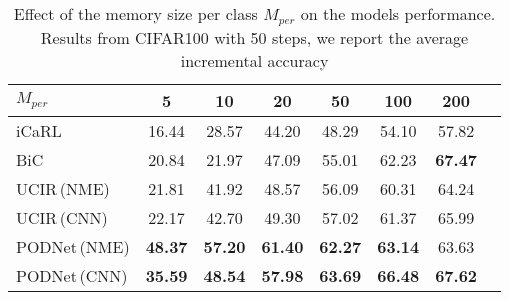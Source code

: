 \begin{table}[t]
    \centering
    \begin{tabular}{@{}lccccccc@{}}
        \toprule
        $M_{per}$                                          & 5              & 10             & \textbf{20}    & 50             & 100            & 200            \\
        \midrule
        iCaRL \citep{rebuffi2017icarl}                     & 16.44          & 28.57          & 44.20          & 48.29          & 54.10          & 57.82          \\
        BiC \citep{wu2019bias_correction}                  & 20.84          & 21.97          & 47.09          & 55.01          & 62.23          & \textbf{67.47} \\
        UCIR\,{\scriptsize (\ac{NME})} \citep{hou2019ucir} & 21.81          & 41.92          & 48.57          & 56.09          & 60.31          & 64.24          \\
        UCIR\,{\scriptsize (CNN)}                          & 22.17          & 42.70          & 49.30          & 57.02          & 61.37          & 65.99          \\
        PODNet\,{\scriptsize (\ac{NME})}                   & \textbf{48.37} & \textbf{57.20} & \textbf{61.40} & \textbf{62.27} & \textbf{63.14} & 63.63          \\
        PODNet\,{\scriptsize (CNN)}                        & \textbf{35.59} & \textbf{48.54} & \textbf{57.98} & \textbf{63.69} & \textbf{66.48} & \textbf{67.62} \\
        \bottomrule
    \end{tabular}
    \caption{Effect of the memory size per class $M_{per}$ on the models performance. Results from CIFAR100 with 50 steps, we report the average incremental accuracy}
    \label{tab:podnet_ablation_memorysize}
\end{table}
